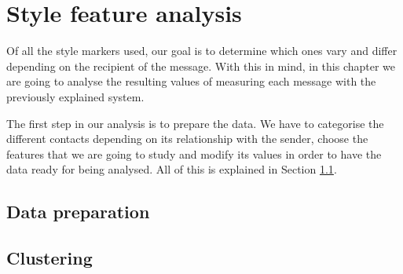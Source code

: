\chapter{Style feature analysis}


Of all the style markers used, our goal is to determine which ones vary and differ depending on the recipient of the message. With this in mind, in this chapter we are going to analyse the resulting values of measuring each message with the previously explained system.

The first step in our analysis is to prepare the data. We have to categorise the different contacts depending on its relationship with the sender, choose the features that we are going to study and modify its values in order to have the data ready for being analysed. All of this is explained in Section \ref{sect:DatPrep}.

\section{Data preparation}\label{sect:DatPrep}


\section{Clustering}
